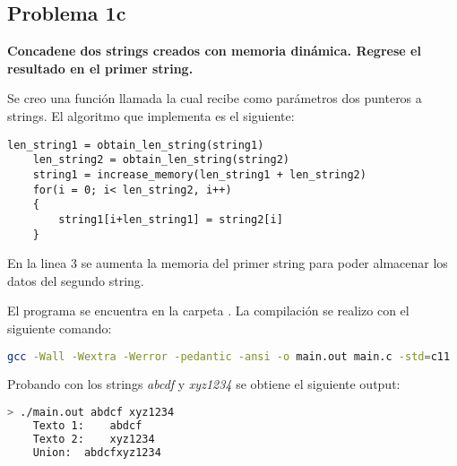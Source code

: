 \subsection*{Problema 1c}

\textbf{Concadene dos strings creados con memoria dinámica. Regrese el resultado en el primer string.}

Se creo una función llamada  la cual recibe como parámetros dos punteros a strings. El algoritmo que implementa es el siguiente:

\begin{lstlisting}[style=CStyle]
    len_string1 = obtain_len_string(string1)
    len_string2 = obtain_len_string(string2)
    string1 = increase_memory(len_string1 + len_string2)
    for(i = 0; i< len_string2, i++)
    {
        string1[i+len_string1] = string2[i]
    }
\end{lstlisting}

En la linea 3 se aumenta la memoria del primer string para poder almacenar los datos del segundo string.

El programa se encuentra en la carpeta . La compilación se realizo con el siguiente comando:

\begin{lstlisting}[language=bash]
    gcc -Wall -Wextra -Werror -pedantic -ansi -o main.out main.c -std=c11
\end{lstlisting}

Probando con los strings \textit{abcdf} y \textit{xyz1234} se obtiene el siguiente output:

\begin{lstlisting}[language=bash]
    > ./main.out abdcf xyz1234
    Texto 1:	abdcf
    Texto 2:	xyz1234
    Union:	abdcfxyz1234
\end{lstlisting}
